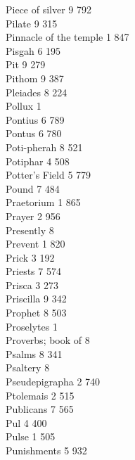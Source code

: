 Piece of silver \hfill 9 \quad \phantom{0}792\\
Pilate \hfill 9 \quad \phantom{0}315\\
Pinnacle of the temple \hfill 1 \quad \phantom{0}847\\
Pisgah \hfill 6 \quad \phantom{0}195\\
Pit \hfill 9 \quad \phantom{0}279\\
Pithom \hfill 9 \quad \phantom{0}387\\
Pleiades \hfill 8 \quad \phantom{0}224\\
Pollux \hfill 1 \\
Pontius \hfill 6 \quad \phantom{0}789\\
Pontus \hfill 6 \quad \phantom{0}780\\
Poti-pherah \hfill 8 \quad \phantom{0}521\\
Potiphar \hfill 4 \quad \phantom{0}508\\
Potter’s Field \hfill 5 \quad \phantom{0}779\\
Pound \hfill 7 \quad \phantom{0}484\\
Praetorium \hfill 1 \quad \phantom{0}865\\
Prayer \hfill 2 \quad \phantom{0}956\\
Presently \hfill 8 \\
Prevent \hfill 1 \quad \phantom{0}820\\
Prick \hfill 3 \quad \phantom{0}192\\
Priests \hfill 7 \quad \phantom{0}574\\
Prisca \hfill 3 \quad \phantom{0}273\\
Priscilla \hfill 9 \quad \phantom{0}342\\
Prophet \hfill 8 \quad \phantom{0}503\\
Proselytes \hfill 1 \\
Proverbs; book of \hfill 8 \\
Psalms \hfill 8 \quad \phantom{0}341\\
Psaltery \hfill 8 \\
Pseudepigrapha \hfill 2 \quad \phantom{0}740\\
Ptolemais \hfill 2 \quad \phantom{0}515\\
Publicans \hfill 7 \quad \phantom{0}565\\
Pul \hfill 4 \quad \phantom{0}400\\
Pulse \hfill 1 \quad \phantom{0}505\\
Punishments \hfill 5 \quad \phantom{0}932\\
